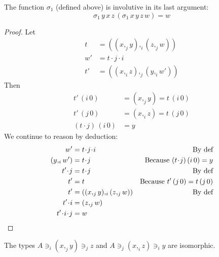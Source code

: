 \documentclass[english]{PaperTools/latex/lipics}
\newcommand\CP[3]{(#2,_{#1} #3)}
\newcommand\param[1]{\!\cdot\!#1}
\newcommand\op[1]{∋_{#1}}
\newcommand\mor[2]{({#1}\,{#2})}
\newcommand\proj[2]{{#2}\,\mor{#1}0}
\newcommand\projp[2]{\proj{#1}{(#2)}}
\begin{document}
\begin{theorem}
  The function $\sigma_1$ (defined above) is involutive in its last argument:
  \[ \sigma_1\, y\, x\, z\, (\sigma_1\, x\, y\, z\, w) = w \]
\end{theorem}
\begin{proof}
  Let
  \begin{align*}
    t &= \CP i {\CP j x y}{\CP j z w} \\
    w' &= t \param j \param i \\
    t' &= \CP j {\CP i x z}{\CP i y {w'}}
  \end{align*}
  Then
  \begin{align*}
    \proj i {t'} &= \CP j x y = \proj i t \\
    \proj j {t'} &= \CP i x z = \proj j t \\
    \projp i {t\param j} &= y
  \end{align*}
We continue to reason by deduction:
  \begin{align*}
    w' &= t \param j \param i & \text{By def}\\
    {\CP i y {w'}} &= t\param j & \text{Because $\projp i {t\param j} = y $}  \\
    t'\param j &= t\param j & \text{By def}\\
    t' &= t &\text{Because $\proj j {t'} = \proj j t$} \\
    t' &= \CP i {\CP j x y} {\CP j z w} & \text{By def} \\
    t'\param i &= \CP j z w \\
    t'\param i\param j &= w
  \qedhere
  \end{align*}
\end{proof}
\begin{corollary}
  The types $A \op i \CP j x y \op j z$ and $A \op j \CP i x z \op i y$ are isomorphic.
\end{corollary}
\end{document}
